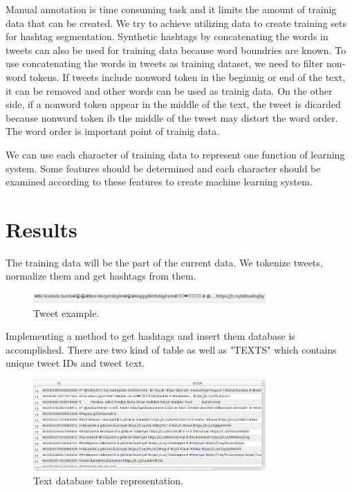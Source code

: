 \documentclass[12pt]{comjnl}
\begin{document}
Manual annotation is time consuming task and it limits the amount of trainig data that can be
created. We try to achieve utilizing data to create training sets for hashtag segmentation. Synthetic
hashtags by concatenating the words in tweets can also be used for training data because word
boundries are known. To use concatenating the words in tweets as training dataset, we need to filter
non­word tokens. If tweets include non­word token in the beginnig or end of the text, it can be
removed and other words can be used as trainig data. On the other side, if a non­word token appear
in the middle of the text, the tweet is dicarded because non­word token ib the middle of the tweet
may distort the word order. The word order is important point of trainig data.

We can use each character of training data to represent one function of learning system. Some
features should be determined and each character should be examined according to these features
to create machine learning system.

\section{Results}
The training data will be the part of the current data. We tokenize tweets, normalize them and get 
hashtags from them. 

\begin{figure}
\centering
\includegraphics[width=3.5in]{tweet.png}
\caption{Tweet example.}\label{fig:Tweet}
\end{figure}

Implementing a method to get hashtags and insert them database is 
accomplished. There are two kind of table as well as "TEXTS" which contains unique tweet IDs
and tweet text. 

\begin{figure}
\centering
\includegraphics[width=3.5in]{text.png}
\caption{Text database table representation.}\label{fig:Tweet}
\end{figure}
\end{document}
